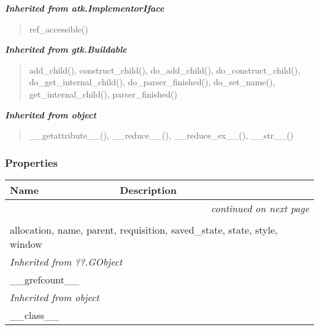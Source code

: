 \large{\textbf{\textit{Inherited from atk.ImplementorIface}}}

\begin{quote}
ref\_accessible()
\end{quote}

\large{\textbf{\textit{Inherited from gtk.Buildable}}}

\begin{quote}
add\_child(), construct\_child(), do\_add\_child(), do\_construct\_child(), do\_get\_internal\_child(), do\_parser\_finished(), do\_set\_name(), get\_internal\_child(), parser\_finished()
\end{quote}

\large{\textbf{\textit{Inherited from object}}}

\begin{quote}
\_\_getattribute\_\_(), \_\_reduce\_\_(), \_\_reduce\_ex\_\_(), \_\_str\_\_()
\end{quote}


  \subsubsection{Properties}

    \vspace{-1cm}
\hspace{\varindent}\begin{longtable}{|p{\varnamewidth}|p{\vardescrwidth}|l}
\cline{1-2}
\cline{1-2} \centering \textbf{Name} & \centering \textbf{Description}& \\
\cline{1-2}
\endhead\cline{1-2}\multicolumn{3}{r}{\small\textit{continued on next page}}\\\endfoot\cline{1-2}
\endlastfoot\multicolumn{2}{|l|}{\textit{Inherited from gtk.Widget}}\\
\multicolumn{2}{|p{\varwidth}|}{\raggedright allocation, name, parent, requisition, saved\_state, state, style, window}\\
\cline{1-2}
\multicolumn{2}{|l|}{\textit{Inherited from ??.GObject}}\\
\multicolumn{2}{|p{\varwidth}|}{\raggedright \_\_grefcount\_\_}\\
\cline{1-2}
\multicolumn{2}{|l|}{\textit{Inherited from object}}\\
\multicolumn{2}{|p{\varwidth}|}{\raggedright \_\_class\_\_}\\
\cline{1-2}
\end{longtable}


